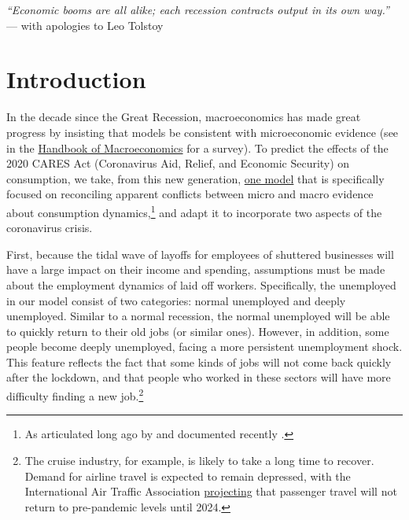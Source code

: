 \documentclass[titlepage,letterpaper]{\econtex}
\begin{document}

\noindent \textit{\large ``Economic booms are all alike; each recession contracts output in its own way.''} --- with apologies to Leo Tolstoy

\section{Introduction}

In the decade since the Great Recession, macroeconomics has made great progress by insisting that models be consistent with microeconomic evidence (see \cite{kmpHandbook} in the \href{https://www.sciencedirect.com/handbook/handbook-of-macroeconomics}{Handbook of Macroeconomics} for a survey).  To predict the effects of the 2020 CARES Act (Coronavirus Aid, Relief, and Economic Security) on consumption, we take, from this new generation, \href{https://econ.jhu.edu/people/ccarroll/papers/cAndCwithSTickyE}{one model} that is specifically focused on reconciling apparent conflicts between micro and macro evidence about consumption dynamics,\footnote{As articulated long ago by \cite{deatonUnderstandingC} and documented recently \cite{hrsHabit}.} and adapt it to incorporate two aspects of the coronavirus crisis.

First, because the tidal wave of layoffs for employees of shuttered businesses will have a large impact on their income and spending, assumptions must be made about the employment dynamics of laid off workers. Specifically, the unemployed in our model consist of two categories: normal unemployed and deeply unemployed. Similar to a normal recession, the normal unemployed will be able to quickly return to their old jobs (or similar ones). However, in addition, some people become deeply unemployed, facing a more persistent unemployment shock. This feature reflects the fact that some kinds of jobs will not come back quickly after the lockdown, and that people who worked in these sectors will have more difficulty finding a new job.\footnote{The cruise industry, for example, is likely to take a long time to recover. Demand for airline travel is expected to remain depressed, with the International Air Traffic Association \href{https://www.iata.org/en/pressroom/pr/2020-07-28-02/}{projecting} that passenger travel will not return to pre-pandemic levels until 2024.}
\end{document}
